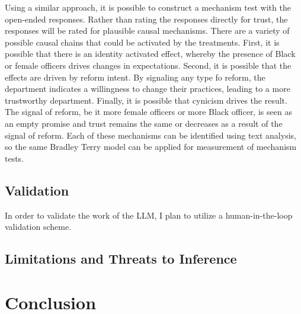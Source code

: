 \documentclass[12pt]{article}
\begin{document}
Using a similar approach, it is possible to construct a mechanism test with the open-ended responses. Rather than rating the responses directly for trust, the responses will be rated for plausible causal mechanisms. There are a variety of possible causal chains that could be activated by the treatments. First, it is possible that there is an identity activated effect, whereby the presence of Black or female officers drives changes in expectations. Second, it is possible that the effects are driven by reform intent. By signaling any type fo reform, the department indicates a willingness to change their practices, leading to a more trustworthy department. Finally, it is possible that cynicism drives the result. The signal of reform, be it more female officers or more Black officer, is seen as an empty promise and trust remains the same or decreases as a result of the signal of reform. Each of these mechanisms can be identified using text analysis, so the same Bradley Terry model can be applied for measurement of mechanism tests. 

\subsection{Validation}

In order to validate the work of the LLM, I plan to utilize a human-in-the-loop validation scheme. 

\subsection{Limitations and Threats to Inference}

\section{Conclusion}


\newpage
\singlespacing
\renewcommand{\refname}{References\vspace{.3cm}}

\end{document}
